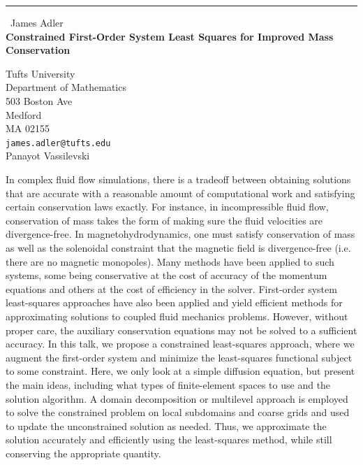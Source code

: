 \documentclass{report}
\begin{document}
\begin{center}
\rule{6in}{1pt} \
{\large James Adler \\
{\bf Constrained First-Order System Least Squares for Improved Mass Conservation}}

Tufts University \\ Department of Mathematics \\ 503 Boston Ave \\ Medford \\ MA 02155
\\
{\tt james.adler@tufts.edu}\\
Panayot Vassilevski\end{center}

In complex fluid flow simulations, there is a tradeoff between obtaining
solutions that are accurate with a reasonable amount of computational
work and satisfying certain conservation laws exactly. For instance, in
incompressible fluid flow, conservation of mass takes the form of making
sure the fluid velocities are divergence-free. In magnetohydrodynamics,
one must satisfy conservation of mass as well as the solenoidal
constraint that the magnetic field is divergence-free (i.e. there are no
magnetic monopoles). Many methods have been applied to such systems, some
being conservative at the cost of accuracy of the momentum equations and
others at the cost of efficiency in the solver. First-order system
least-squares approaches have also been applied and yield efficient
methods for approximating solutions to coupled fluid mechanics problems.
However, without proper care, the auxiliary conservation equations may
not be solved to a sufficient accuracy. In this talk, we propose a
constrained least-squares approach, where we augment the first-order
system and minimize the least-squares functional subject to some
constraint. Here, we only look at a simple diffusion equation, but
present the main ideas, including what types of finite-element spaces to
use and the solution algorithm. A domain decomposition or multilevel
approach is employed to solve the constrained problem on local subdomains
and coarse grids and used to update the unconstrained solution as needed.
Thus, we approximate the solution accurately and efficiently using the
least-squares method, while still conserving the appropriate quantity.
\end{document}
